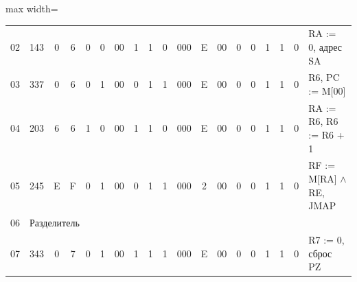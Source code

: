 \documentclass[11pt, a4paper]{article}
\begin{document}
{\begin{table}[h!]
\begin{adjustbox}{max width=\textwidth}
\begin{tabular}{|c|c|c|c|c|c|c|c|c|c|c|c|c|c|c|c|c|c|l|}
				02          & 143                               & 0                                 & 6                                      & 0                                      & 0             & 00          & 1                                       & 1                                     & 0                    & 000            & E             & 00         & 0          & 0            & 1           & 1            & 0           & RA := 0, адрес SA              \\
				03          & 337                               & 0                                 & 6                                      & 0                                      & 1             & 00          & 0                                       & 1                                     & 1                    & 000            & E             & 00         & 0          & 0            & 1           & 1            & 0           & R6, PC := M[00]                \\
				04          & 203                               & 6                                 & 6                                      & 1                                      & 0             & 00          & 1                                       & 1                                     & 0                    & 000            & E             & 00         & 0          & 0            & 1           & 1            & 0           & RA := R6, R6 := R6 + 1         \\
				05          & 245                               & E                                 & F                                      & 0                                      & 1             & 00          & 0                                       & 1                                     & 1                    & 000            & 2             & 00         & 0          & 0            & 1           & 1            & 0           & RF := M[RA] $\wedge$ RE, JMAP  \\
				06          & \multicolumn{18}{l|}{Разделитель}                                                                                                                                                                                                                                                                                                                                                                                                                    \\
				07          & 343                               & 0                                 & 7                                      & 0                                      & 1             & 00          & 1                                       & 1                                     & 1                    & 000            & E             & 00         & 0          & 0            & 1           & 1            & 0           & R7 := 0, сброс PZ              \\

\end{tabular}
\end{adjustbox}
\end{table}}
\end{document}
